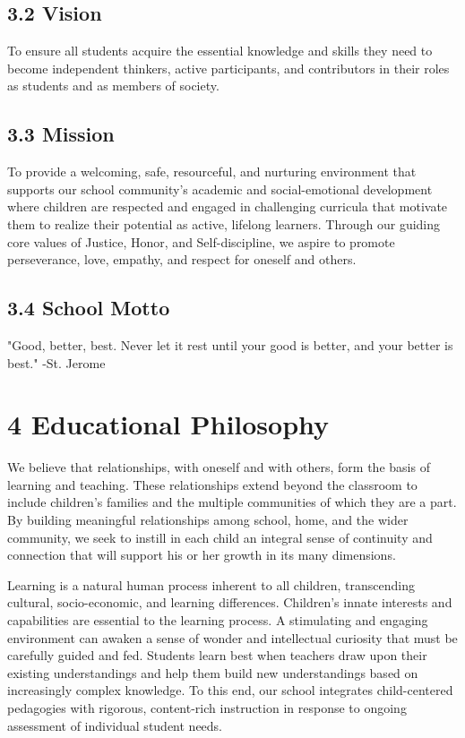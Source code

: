 \documentclass[11pt]{article}
\begin{document}
\subsection{3.2 Vision}
\label{sec:org5c1a5f6}

To ensure all students acquire the essential knowledge and skills they need to become independent thinkers, active participants, and contributors in their roles as students and as members of society.

\subsection{3.3 Mission}
\label{sec:org09450ae}

To provide a welcoming, safe, resourceful, and nurturing environment that supports our school community’s academic and social-emotional development where children are respected and engaged in challenging curricula that motivate them to realize their potential as active, lifelong learners. Through our guiding core values of Justice, Honor, and Self-discipline, we aspire to promote perseverance, love, empathy, and respect for oneself and others.

\subsection{3.4 School Motto}
\label{sec:org79d0b1e}

"Good, better, best. Never let it rest until your good is better, and your better is best." -St. Jerome
\section{4 Educational Philosophy}
\label{sec:org3b7accb}

We believe that relationships, with oneself and with others, form the basis of learning and teaching. These relationships extend beyond the classroom to include children’s families and the multiple communities of which they are a part. By building meaningful relationships among school, home, and the wider community, we seek to instill in each child an integral sense of continuity and connection that will support his or her growth in its many dimensions.

Learning is a natural human process inherent to all children, transcending cultural, socio-economic, and learning differences. Children’s innate interests and capabilities are essential to the learning process. A stimulating and engaging environment can awaken a sense of wonder and intellectual curiosity that must be carefully guided and fed. Students learn best when teachers draw upon their existing understandings and help them build new understandings based on increasingly complex knowledge. To this end, our school integrates child-centered pedagogies with rigorous, content-rich instruction in response to ongoing assessment of individual student needs.
\end{document}
